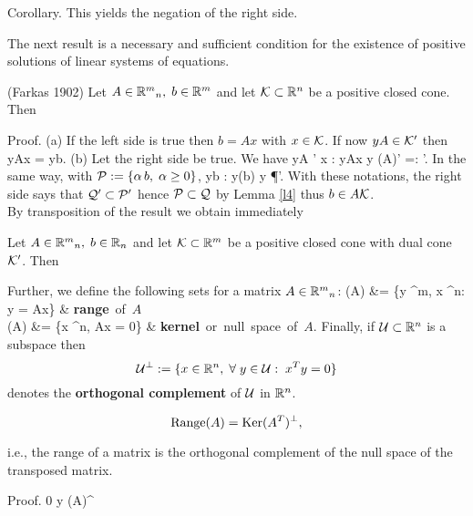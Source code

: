 Corollary. This yields the negation of the right side.
\par
%
%
The next result is a necessary and sufficient condition for the existence of
positive solutions of linear systems of equations.
%
%
\begin{lemma} \label{l5} ({\sc Farkas} 1902)
Let $A \in \Bbb{R}^m{}_n, \; b \in \Bbb{R}^m$ and let $\K \subset \Bbb{R}^n$ be
a positive closed cone. Then
\beqn
{}
\eeqn
\end{lemma}
%
Proof. (a) If the left side is true then $b = Ax$ with
$x \in \K$. If now $yA \in \K'$ then
 \leq yAx = yb.
\eeqn
(b) Let the right side be true. We have
\beqn
yA \in \K' \Longleftrightarrow \forall \: x \in \K: \; yAx 
\Longleftrightarrow y \in (A\K )' =: \Q '.
\eeqn
In the same way, with $\P := \{\alpha \, b, \; \alpha  \geq
0\}$,
\beqn
yb  \Longleftrightarrow \forall \; \alpha  {}: \; y(\alpha b)
 \Longleftrightarrow y \in \P'.
\eeqn
With these notations, the right side says that $\Q ' \subset
\P '$ hence $\P \subset \Q $ by Lemma \ref{l4} thus $b \in A\K $.\\
%
%
By transposition of the result we obtain immediately
%
\begin{corollary} \label{f1}
Let $A \in \Bbb{R}^m{}_n, \; b \in \Bbb{R}_n$ and let
$\K \subset \Bbb{R}^m$ be a positive closed cone with dual cone
$\K'$. Then
\beqn
{}
\eeqn
\end{corollary}
%
Further, we define the following sets for a matrix $A \in \Bbb{R}^m{}_n$:
\beqn {}
\Range (A) &= \{y \in {}^m, \; \exists  \; x \in {}^n: \; y =
Ax\} & \mbox{{\bf range} of $A$}\\
\Ker (A) &= \{x \in {}^n, \; Ax = 0\} &
\mbox{{\bf kernel} or null space of $A$}.
 \eeqn
%
Finally, if ${\cal U} \subset \Bbb{R}^n$ is a subspace then
\[
{\cal U}^{\perp} := \{x \in \Bbb{R}^n, \; \forall \; y \in {\cal U}: \; x^Ty =
0\}
\]
denotes the {\bf orthogonal complement} of ${\cal U}$ in $\Bbb{R}^n$.
%
\begin{theorem} \label{s1}
\[
\Range (A) = \Ker (A^T)^{\perp},
\]
\par
i.e., the range of a matrix is the orthogonal complement of the null space
of the transposed matrix.
\end{theorem}
%
Proof.
\beqn {}
0 \neq y \in \Range (A)^{\perp} \Longleftrightarrow
